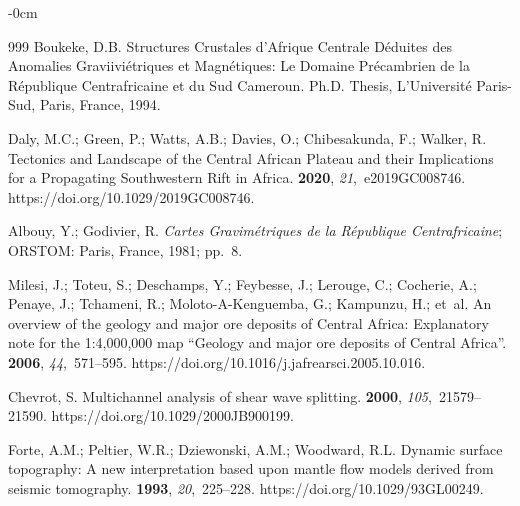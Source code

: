 \documentclass[minerals,article,accept,pdftex,moreauthors]{Definitions/mdpi}
\begin{document}
\begin{adjustwidth}{-\extralength}{0cm}
\begin{thebibliography}{999}
Boukeke, D.B.
\newblock Structures Crustales d'Afrique Centrale Déduites des Anomalies
  Graviiviétriques et Magnétiques: Le Domaine Précambrien de la République
  Centrafricaine et du Sud Cameroun.
\newblock Ph.D. Thesis, L'Université Paris-Sud, Paris, France, 1994. %

Daly, M.C.; Green, P.; Watts, A.B.; Davies, O.; Chibesakunda, F.; Walker, R.
\newblock Tectonics and Landscape of the Central African Plateau and their
  Implications for a Propagating Southwestern Rift in Africa.
 {\bf 2020}, {\em
  21},~e2019GC008746.
\newblock https://doi.org/10.1029/2019GC008746.

Albouy, Y.; Godivier, R.
\newblock \emph{Cartes Gravimétriques de la République Centrafricaine};
\newblock ORSTOM: Paris, France,  1981; pp.~8.

Milesi, J.; Toteu, S.; Deschamps, Y.; Feybesse, J.; Lerouge, C.; Cocherie, A.;
  Penaye, J.; Tchameni, R.; Moloto-A-Kenguemba, G.; Kampunzu, H.;  et~al.
\newblock An overview of the geology and major ore deposits of Central Africa:
  Explanatory note for the 1:4,000,000 map “Geology and major ore deposits of
  Central Africa”.
 {\bf 2006}, {\em
  44},~571--595. %
\newblock   https://doi.org/10.1016/j.jafrearsci.2005.10.016.

Chevrot, S.
\newblock Multichannel analysis of shear wave splitting.
 {\bf 2000}, {\em
  105},~21579--21590.
\newblock https://doi.org/10.1029/2000JB900199.

Forte, A.M.; Peltier, W.R.; Dziewonski, A.M.; Woodward, R.L.
\newblock Dynamic surface topography: A new interpretation based upon mantle
  flow models derived from seismic tomography.
 {\bf 1993}, {\em 20},~225--228.
\newblock https://doi.org/10.1029/93GL00249.


\end{thebibliography}
\end{adjustwidth}
\end{document}
